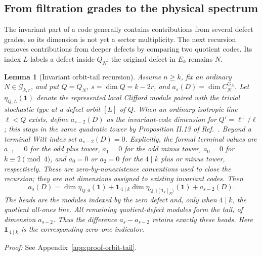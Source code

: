 \documentclass[journal,twocolumn]{IEEEtran}
\newtheorem{lemma}[theorem]{Lemma}
\theoremstyle{definition}
\theoremstyle{plain}
\newcommand{\one}{\bm 1}
\newcommand{\cG}{\mathcal G}
\begin{document}
\subsection{From filtration grades to the physical spectrum}
The invariant part of a code generally contains contributions from several
defect grades, so its dimension is not yet a sector multiplicity.  The next recursion
removes contributions from deeper defects by comparing two quotient
codes.  Its index $L$ labels a defect inside $Q_N$; the original defect
in $E_k$ remains $N$.

\begin{lemma}[Invariant orbit-tail recursion]
\label{lemS:orbit-tail}
Assume $n\geq k$, fix an ordinary $N\in\cG_{k,r}$, and put
$Q=Q_N$, $s=\dim Q=k-2r$, and
$a_s(D)=\dim C_N^{G_N}$.  Let $\eta_{Q,L}(\bm1)$ denote the represented local
Clifford module paired with the trivial stochastic type at a defect orbit
$[L]$ of $Q$.  When an ordinary isotropic line $\ell<Q$ exists, define
$a_{s-2}(D)$ as the invariant-code dimension for
$Q'=\ell^\perp/\ell$; this stays in the same quadratic tower by
Proposition II.13 of Ref.~\cite{MontealegreGross2025}.  Beyond a terminal
Witt index set $a_{s-2}(D)=0$.  Explicitly, the formal terminal values
are $a_{-1}=0$ for the odd plus tower, $a_1=0$ for the odd minus tower,
$a_0=0$ for $k\equiv2\pmod4$, and $a_0=0$ or $a_2=0$ for the
$4\mid k$ plus or minus tower, respectively.  These are
zero-by-nonexistence conventions used to close the recursion; they are not
dimensions assigned to existing invariant codes.  Then
\begin{equation}
 a_s(D)=
 \dim\eta_{Q,0}(\bm1)
 +\bm1_{\,4\mid k}\dim\eta_{Q,\langle[\one_k]_N\rangle}(\bm1)
 +a_{s-2}(D).
 \label{eqS:orbit-tail-recursion}
\end{equation}
The \emph{heads} are the modules indexed by the zero defect and, only
when $4\mid k$, the quotient all-ones line.  All remaining quotient-defect
modules form the \emph{tail}, of dimension $a_{s-2}$.  Thus the difference
$a_s-a_{s-2}$ retains exactly these heads.  Here $\bm1_{\,4\mid k}$ is the
corresponding zero--one indicator.
\end{lemma}

\noindent\emph{Proof:} See Appendix~\ref{app:proof-orbit-tail}.\par
\end{document}
